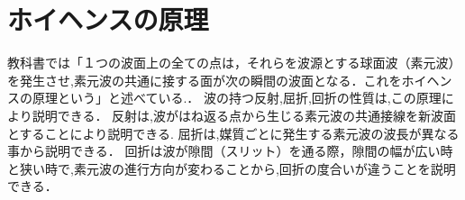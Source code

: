 \documentclass[a4j,twocolumn,uplatex]{jarticle}
\begin{document}
\section{ホイヘンスの原理}
教科書では「１つの波面上の全ての点は，それらを波源とする球面波（素元波）を発生させ,素元波の共通に接する面が次の瞬間の波面となる．これをホイヘンスの原理という」と述べている.\cite{kyoukasyo}．
波の持つ反射,屈折,回折の性質は,この原理により説明できる．
反射は,波がはね返る点から生じる素元波の共通接線を新波面とすることにより説明できる.
屈折は,媒質ごとに発生する素元波の波長が異なる事から説明できる．
回折は波が隙間（スリット）を通る際，隙間の幅が広い時と狭い時で,素元波の進行方向が変わることから,回折の度合いが違うことを説明できる．
\vspace{-4mm}

\begin{figure}[htbp]

\end{figure}
\end{document}
